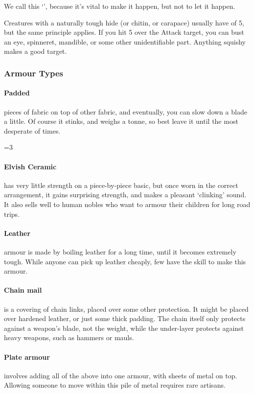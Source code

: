 \begin{multicols}{2}
We call this `', because it's vital to make it happen, but not to let it happen.

Creatures with a naturally tough hide (or chitin, or carapace) usually have  of 5, but the same principle applies.
If you hit 5 over the Attack target, you can bust an eye, spinneret, mandible, or some other unidentifiable part.
Anything squishy makes a good target.

\armourchart

\subsubsection{Armour Types}

\paragraph{Padded}
pieces of fabric on top of other fabric, and eventually, you can slow down a blade a little.
Of course it stinks, and weighs a tonne, so best leave it until the most desperate of times.

\ifnum\value{r4}=3
  \paragraph{Elvish Ceramic}
  has very little strength on a piece-by-piece basic, but once worn in the correct arrangement, it gains surprising strength, and makes a pleasant `clinking' sound.
  It also sells well to human nobles who want to armour their children for long road trips. 
\fi

\paragraph{Leather}
armour is made by boiling leather for a long time, until it becomes extremely tough.
While anyone can pick up leather cheaply, few have the skill to make this armour.

\paragraph{Chain mail}
is a covering of chain links, placed over some other protection.
It might be placed over hardened leather, or just some thick padding.
The chain itself only protects against a weapon's blade, not the weight, while the under-layer protects against heavy weapons, such as hammers or mauls.

\paragraph{Plate armour}
involves adding all of the above into one armour, with sheets of metal on top.
Allowing someone to move within this pile of metal requires rare artisans.



\end{multicols}
